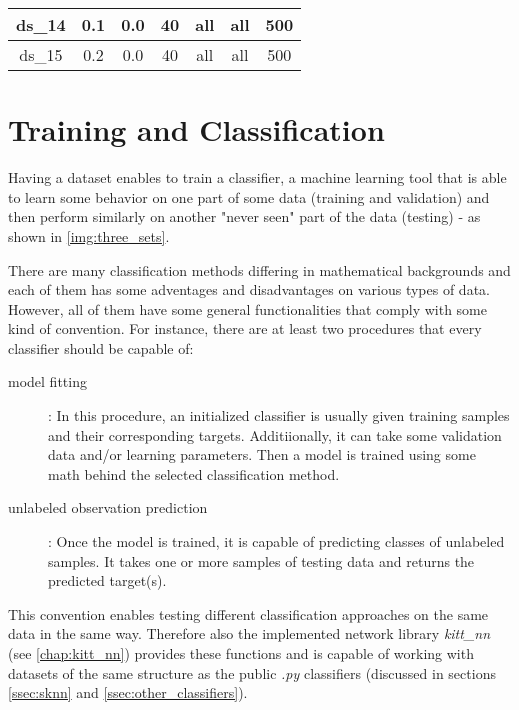 \begin{table}[H]
\begin{tabular}{|c|c|c|c|c|c|c|}
ds\_14                              & 0.1                                             & 0.0                                            & 40                                      & all                                   & all                                    & 500                                     \\ \hline
ds\_15                              & 0.2                                             & 0.0                                            & 40                                      & all                                   & all                                    & 500                                     \\ \hline
\end{tabular}
\end{table}

\section{Training and Classification}
Having a dataset enables to train a classifier, a machine learning tool that is able to learn some behavior on one part of some data (training and validation) and then perform similarly on another "never seen" part of the data (testing) - as shown in \cref{img:three_sets}.

There are many classification methods differing in mathematical backgrounds and each of them has some adventages and disadvantages on various types of data. However, all of them have some general functionalities that comply with some kind of convention. For instance, there are at least two procedures that every classifier should be capable of:

\begin{description}
\item[model fitting] : In this procedure, an initialized classifier is usually given training samples and their corresponding targets. Additiionally, it can take some validation data and/or learning parameters. Then a model is trained using some math behind the selected classification method.
\item[unlabeled observation prediction] : Once the model is trained, it is capable of predicting classes of unlabeled samples. It takes one or more samples of testing data and returns the predicted target(s).
\end{description}

This convention enables testing different classification approaches on the same data in the same way. Therefore also the implemented network library \textit{kitt\_nn} (see \cref{chap:kitt_nn}) provides these functions and is capable of working with datasets of the same structure as the public \textit{.py} classifiers (discussed in sections \ref{ssec:sknn} and \ref{ssec:other_classifiers}).

